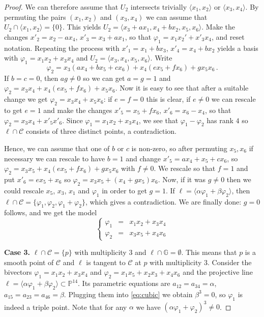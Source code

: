 \documentclass[10pt,reqno]{amsart}
\newcommand{\la}{\langle}
\newcommand{\ra}{\rangle}
\newcommand{\cC}{{\mathcal{C}}}
\newcommand{\GG}{\mathbb{G}}
\newcommand{\PP}{\mathbb P}
\renewcommand{\a}{\alpha}
\renewcommand{\b}{\beta}
\newcommand{\f}{\varphi}
\theoremstyle{definition}
\begin{document}
\begin{proof}
\item We can therefore assume that $U_2$ intersects trivially $\la x_1, x_2 \ra$ or $\la x_3, x_4 \ra$. By permuting the pairs $(x_1,x_2)$ and $(x_3,x_4)$ we can assume that $U_2 \cap \la x_1, x_2 \ra=\{0\}$. This yields $U_2=\la x_3+ax_1, x_4+bx_2, x_5,x_6 \ra$. Make the changes $x'_2=x_2-ax_4$, $x'_3=x_3+ax_1$, so that $\f_1=x_1x_2'+x'_3x_4$, and reset notation. Repeating the process with $x'_1=x_1+bx_3$, $x'_4=x_4+bx_2$ yields a basis with $\f_1=x_1x_2+x_3x_4$ and $U_2=\la x_3,x_4,x_5,x_6 \ra$. Write
\[
\f_2=x_3(ax_4+bx_5+cx_6)+x_4(ex_5+fx_6)+gx_5x_6 \, .
\]
If $b=c=0$, then $ag \ne 0$ so we can get $a=g=1$ and $\f_2=x_3x_4+x_4(ex_5+fx_6)+x_5x_6$. Now it is easy to see that after a suitable change we get $\f_2=x_3x_4+x_5x_6$: if $e=f=0$ this is clear, if $e\ne 0$ we can rescale to get $e=1$ and make the changes $x'_5=x_5+fx_6$, $x'_6=x_6-x_4$, so that $\f_2=x_3x_4+x'_5x'_6$. Since $\f_1=x_1x_2+x_3x_4$, we see that $\f_1-\f_2$ has rank $4$ so $\ell\cap\cC$ consists of three distinct points, a contradiction.
\item Hence, we can assume that one of $b$ or $c$ is non-zero, so after permuting $x_5,x_6$ if necessary we can rescale to have $b=1$ and change $x'_5=ax_4+x_5+cx_6$, so $\f_2=x_3x_5+x_4(ex_5+fx_6)+gx_5x_6$ with $f \ne 0$. We rescale so that $f=1$ and put $x'_6=ex_5+x_6$ so $\f_2=x_3x_5+(x_4+gx_5)x_6$. Now, if it was $g\ne 0$ then we could rescale $x_5$, $x_3$, $x_1$ and $\f_1$ in order to get $g=1$. If $\ell=\la\a \f_1+ \b \f_2\ra$, then $\ell \cap \cC=\{\f_1,\f_2,\f_1+\f_2\}$, which gives a contradiction. We are finally done: $g=0$ follows, and we get the model
\[
\left\{\begin{array}{ccl}
 \f_1 & = & x_1x_2+x_3x_4\\
 \f_2 & = & x_3x_5+x_4x_6
\end{array}\right.
\]

\medskip

\noindent \textbf{Case 3.} $\ell \cap \cC=\{p\}$ with multiplicity $3$ and $\ell \cap \GG=\emptyset$. This means that $p$ is a smooth point of $\cC$ and $\ell$ is tangent to $\cC$ at $p$ with multiplicity $3$.
Consider the bivectors $\f_1=x_1x_2+x_3x_4$ and $\f_2=x_1x_5+x_2x_3+x_4x_6$ and the projective line $\ell=\la\a \f_1+\b \f_2\ra\subset\PP^{14}$. Its parametric equations are $a_{12}=a_{34}=\a$, $a_{15}=a_{23}=a_{46}=\b$. Plugging them into \eqref{eq:cubic} we obtain $\b^3=0$, so $\f_1$ is indeed a triple point. Note that for any $\a$ we have $(\a \f_1 + \f_2)^3 \ne 0$.


\end{proof}
\end{document}
